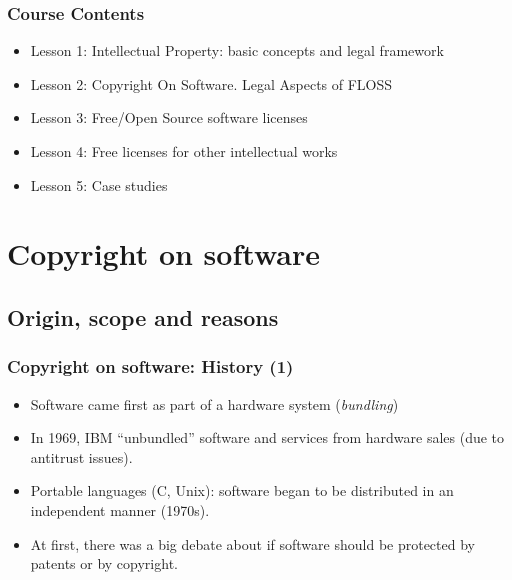 \documentclass{beamer}
\begin{document}

\begin{frame}
  \frametitle{Course Contents}

  \begin{itemize}
    \item Lesson 1: Intellectual Property: basic concepts and legal framework
    \item \alert{Lesson 2: Copyright On Software. Legal Aspects of FLOSS}
    \item Lesson 3: Free/Open Source software licenses
    \item Lesson 4: Free licenses for other intellectual works
    \item Lesson 5: Case studies
  \end{itemize}

\end{frame}




\section{Copyright on software}

\subsection{Origin, scope and reasons}
\begin{frame}
\frametitle{Copyright on software: History (1)}

\begin{itemize}
\item Software came first as part of a hardware system (\emph{bundling})
\item In 1969, IBM ``unbundled'' software and services from hardware sales (due to antitrust issues).
\item Portable languages (C, Unix): software began to be distributed in an independent manner (1970s).
\item At first, there was a big debate about if software should be protected
by patents or by copyright.
\end{itemize}

\end{frame}
\end{document}
